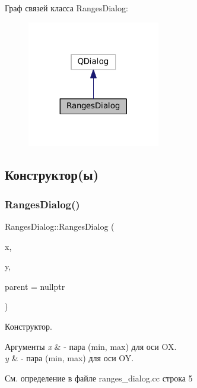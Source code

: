 Граф связей класса Ranges\+Dialog\+:\nopagebreak
\begin{figure}[H]
\begin{center}
\leavevmode
\includegraphics[width=164pt]{class_ranges_dialog__coll__graph}
\end{center}
\end{figure}


\subsection{Конструктор(ы)}
\hypertarget{class_ranges_dialog_a029bf2335408c07771d67c5875433214}{}\label{class_ranges_dialog_a029bf2335408c07771d67c5875433214} 
\subsubsection{\texorpdfstring{Ranges\+Dialog()}{RangesDialog()}}
{\footnotesize\ttfamily Ranges\+Dialog\+::\+Ranges\+Dialog (\begin{DoxyParamCaption}\item[{const Math\+::\+Vector2 \&}]{x,  }\item[{const Math\+::\+Vector2 \&}]{y,  }\item[{Q\+Widget $\ast$}]{parent = {\ttfamily nullptr} }\end{DoxyParamCaption})}



Конструктор. 


\begin{DoxyParams}{Аргументы}
{\em x} & -\/ пара (min, max) для оси OX. \\
\hline
{\em y} & -\/ пара (min, max) для оси OY. \\
\hline
\end{DoxyParams}


См. определение в файле ranges\+\_\+dialog.\+cc строка 5



